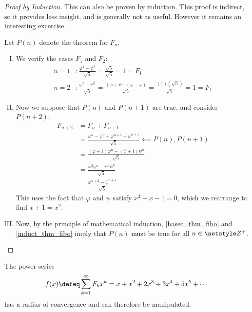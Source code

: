 \begin{proof}[Proof by Induction]
 This can also be proven by induction. This proof is indirect, so it provides
 less insight, and is generally not as useful. However it remains an
 interesting excercise.

 Let \(P(n)\) denote the theorem for \(F_n\).
 \begin{enumerate}[I.]
  \item \label{basec_thm_fibo} We verify the cases \(F_1\) and \(F_2\):
        \begin{align*}
            n = 1&: \frac{\varphi^1 - \psi^1}{\sqrt 5}
                = \frac{\sqrt 5}{\sqrt 5} = 1 = F_1 \\
            n = 2&: \frac{\varphi^2 - \psi^2}{\sqrt 5}
                = \frac{(\varphi + \psi)(\varphi - \psi)}{\sqrt 5}
                = \frac{(1)(\sqrt 5)}{\sqrt 5}= 1 = F_1
        \end{align*}
  \item \label{induct_thm_fibo} Now we suppose that \(P(n)\) and \(P(n + 1)\)
        are true, and consider \(P(n + 2)\):
        \begin{align*}
            F_{n + 2} &= F_n + F_{n + 1} \\
                      &= \frac{\varphi^n - \psi^n +
                               \varphi^{n + 1} - \psi^{n + 1}}
                              {\sqrt 5} \impliedby P(n), P(n + 1) \\
                      &= \frac{(\varphi + 1)\varphi^n - (\psi + 1)\psi^n}
                               {\sqrt 5} \\
                      &= \frac{\varphi^2\varphi^n - \psi^2\psi^n}{\sqrt 5} \\
                      &= \frac{\varphi^{n + 2} - \psi^{n + 1}}{\sqrt 5}
        \end{align*}
        This uses the fact that \(\varphi\) and \(\psi\) satisfy
        \(x^2 - x - 1 = 0\), which we rearrange to find \(x + 1 = x^2\).
  \item Now, by the principle of mathematical induction, \ref{basec_thm_fibo}
        and \ref{induct_thm_fibo} imply that \(P(n)\) must be true for all \(n
        \in \Integers^+\). \qedhere
 \end{enumerate}
\end{proof}
\begin{lemma}
\label{lem_fibo_convergence}
 The power series
 \begin{equation*}
  f(x) \defeq \sum_{k=1}^\infty F_k x^k = x + x^2 + 2x^3 + 3x^4 + 5x^5
      + \dotsb
 \end{equation*}
 has a radius of convergence and can therefore be manipulated.
\end{lemma}
